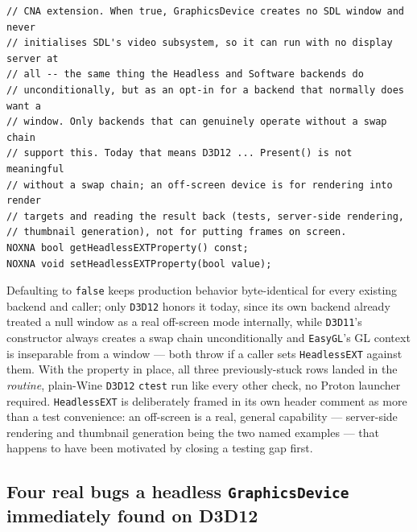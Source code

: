 \begin{lstlisting}
// CNA extension. When true, GraphicsDevice creates no SDL window and never
// initialises SDL's video subsystem, so it can run with no display server at
// all -- the same thing the Headless and Software backends do
// unconditionally, but as an opt-in for a backend that normally does want a
// window. Only backends that can genuinely operate without a swap chain
// support this. Today that means D3D12 ... Present() is not meaningful
// without a swap chain; an off-screen device is for rendering into render
// targets and reading the result back (tests, server-side rendering,
// thumbnail generation), not for putting frames on screen.
NOXNA bool getHeadlessEXTProperty() const;
NOXNA void setHeadlessEXTProperty(bool value);
\end{lstlisting}

Defaulting to \texttt{false} keeps production behavior byte-identical for every existing backend
and caller; only \texttt{D3D12} honors it today, since its own backend already treated a null
window as a real off-screen mode internally, while \texttt{D3D11}'s constructor always creates a
swap chain unconditionally and \texttt{EasyGL}'s GL context is inseparable from a window --- both
throw if a caller sets \texttt{HeadlessEXT} against them. With the property in place, all three
previously-stuck rows landed in the \emph{routine}, plain-Wine \texttt{D3D12} \texttt{ctest} run
like every other check, no Proton launcher required. \texttt{HeadlessEXT} is deliberately framed
in its own header comment as more than a test convenience: an off-screen 
is a real, general capability --- server-side rendering and thumbnail generation being the two
named examples --- that happens to have been motivated by closing a testing gap first.

\subsection{Four real bugs a headless \texttt{GraphicsDevice} immediately found on D3D12}

